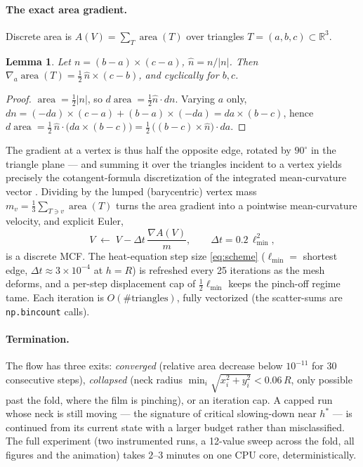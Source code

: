 \documentclass[11pt,a4paper]{article}
\newtheorem{lemma}{Lemma}
\newcommand{\R}{\mathbb{R}}
\begin{document}
\paragraph{The exact area gradient.} Discrete area is
$A(V)=\sum_T \operatorname{area}(T)$ over triangles $T=(a,b,c)\subset\R^3$.

\begin{lemma}
Let $n=(b-a)\times(c-a)$, $\hat n=n/\lvert n\rvert$. Then
$\nabla_{\!a}\operatorname{area}(T)=\tfrac12\,\hat n\times(c-b)$, and
cyclically for $b,c$.
\end{lemma}

\begin{proof}
$\operatorname{area}=\tfrac12\lvert n\rvert$, so
$d\operatorname{area}=\tfrac12\hat n\cdot dn$. Varying $a$ only,
$dn=(-da)\times(c-a)+(b-a)\times(-da)=da\times(b-c)$, hence
$d\operatorname{area}=\tfrac12\,\hat n\cdot\big(da\times(b-c)\big)
=\tfrac12\,\big((b-c)\times\hat n\big)\cdot da$.
\end{proof}

The gradient at a vertex is thus half the opposite edge, rotated by $90^\circ$
in the triangle plane --- and summing it over the triangles incident to a
vertex yields precisely the cotangent-formula discretization of the integrated
mean-curvature vector \cite{pinkall,meyer}. Dividing by the lumped
(barycentric) vertex mass $m_v=\tfrac13\sum_{T\ni v}\operatorname{area}(T)$
turns the area gradient into a pointwise mean-curvature velocity, and explicit
Euler,
\begin{equation}
V \;\leftarrow\; V-\Delta t\,\frac{\nabla A(V)}{m},
\qquad
\Delta t = 0.2\,\ell_{\min}^{2},
\label{eq:scheme}
\end{equation}
is a discrete MCF. The heat-equation step size \eqref{eq:scheme}
($\ell_{\min}=$ shortest edge, $\Delta t\approx3\times10^{-4}$ at $h=R$) is
refreshed every 25 iterations as the mesh deforms, and a per-step displacement
cap of $\tfrac12\ell_{\min}$ keeps the pinch-off regime tame. Each iteration is
$O(\#\text{triangles})$, fully vectorized (the scatter-sums are
\texttt{np.bincount} calls).

\paragraph{Termination.} The flow has three exits: \emph{converged} (relative
area decrease below $10^{-11}$ for 30 consecutive steps), \emph{collapsed}
(neck radius $\min_i\sqrt{x_i^2+y_i^2}<0.06\,R$, only possible past the fold,
where the film is pinching), or an iteration cap. A capped run whose neck is
still moving --- the signature of critical slowing-down near $h^{*}$ --- is
continued from its current state with a larger budget rather than
misclassified. The full experiment (two instrumented runs, a 12-value sweep
across the fold, all figures and the animation) takes $2$--$3$ minutes on one
CPU core, deterministically.
\end{document}
